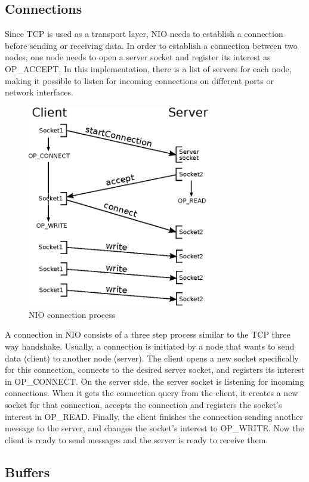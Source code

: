 \documentclass[11pt]{article}
\begin{document}
	\subsection{Connections}
	Since TCP is used as a transport layer, NIO needs to establish a connection before sending or receiving data. In order to establish a connection between two nodes, one node needs to open a server socket and register its interest as OP\_ACCEPT. In this implementation, there is a list of servers for each node, making it possible to listen for incoming connections on different ports or network interfaces.\\
	\begin{figure}[H]
	\centering
	\includegraphics[width=80mm]{img/drawing1.eps}
	\caption[NIO connection process]{NIO connection process}
	\label{drawing1}
	\end{figure}
	A connection in NIO consists of a three step process similar to the TCP three way handshake. Usually, a connection is initiated by a node that wants to send data (client) to another node (server). The client opens a new socket specifically for this connection, connects to the desired server socket, and registers its interest in OP\_CONNECT. On the server side, the server socket is listening for incoming connections. When it gets the connection query from the client, it creates a new socket for that connection, accepts the connection and registers the socket's interest in OP\_READ. Finally, the client finishes the connection sending another message to the server, and changes the socket's interest to OP\_WRITE. Now the client is ready to send messages and the server is ready to receive them.

\subsection{Buffers} 
	
\end{document}

